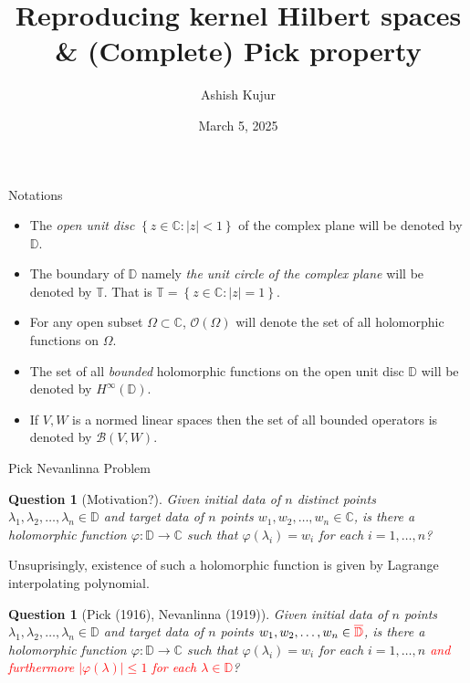 \documentclass{beamer}
\title{Reproducing kernel Hilbert spaces \&  (Complete) Pick property}
\author{Ashish Kujur}
\institute{Indian Institute of Science Education and Research, Thiruvananthapuram}
\date{March 5, 2025}
\newtheorem{question}[theorem]{Question}
\newcommand{\C}{\mathbb C}
\newcommand{\D}{\mathbb D}
\newcommand{\T}{\mathbb T}
\renewcommand{\le}{\leqslant}
\newcommand{\calB}{{\mathcal B}}
\newcommand{\calO}{{\mathcal O}}
\newcommand{\abs}[1]{\left\lvert #1 \right\rvert}
\begin{document}
 \begin{frame}
   \maketitle
 \end{frame}

 \begin{frame}{Notations}
\begin{itemize}
\item The \textit{open unit disc} $\left\{ z\in \C : \abs{z} < 1 \right\}$ of the complex plane will be denoted by $\D$.
\item The boundary of $\D$ namely \textit{the unit circle of the complex plane} will be denoted by $\T$. That is $\T = \left\{ z \in \C : \abs{z} = 1 \right\}$. 
\item For any open subset $\Omega \subset \C$, $\calO \left( \Omega \right)$ will denote the set of all holomorphic functions on $\Omega$.
\item The set of all \textit{bounded} holomorphic functions on the open unit disc $\D$ will be denoted by $H^{\infty} \left( \D \right)$.
\item If $V,W$ is a normed linear spaces then the set of all bounded operators is denoted by $\calB \left( V, W \right)$.
\end{itemize}
 \end{frame}

\begin{frame}{Pick Nevanlinna Problem}
\begin{question}[Motivation?]
Given \textit{initial data} of $n$ distinct points $\lambda_{1}, \lambda_{2}, \ldots , \lambda_{n} \in \D$ and \textit{target data} of $n$ points $w_{1}, w_{2}, \ldots , w_{n} \in \C$, is there a \textit{holomorphic} function $\varphi : \D \to \C$ such that $\varphi \left( \lambda_{i} \right) = w_{i}$ for each $i=1, \ldots, n$?
\end{question}
\pause
Unsuprisingly, existence of such a holomorphic function is given by Lagrange interpolating polynomial.
\pause
\begin{question}[Pick (1916), Nevanlinna (1919)]
Given \textit{initial data} of $n$ points $\lambda_{1}, \lambda_{2}, \ldots , \lambda_{n} \in \D$ and \textit{target data} of $n$ points $w_{1}, w_{2}, \ldots , w_{n} \in \textcolor{red}{\overline{\D}}$, is there a \textit{holomorphic} function $\varphi : \D \to \C$ such that $\varphi \left( \lambda_{i} \right) = w_{i}$ for each $i=1, \ldots, n$ \textcolor{red}{and furthermore $\abs{\varphi \left( \lambda \right)} \le 1$ for each $\lambda \in \D$}?
\end{question}
\end{frame}
\end{document}

